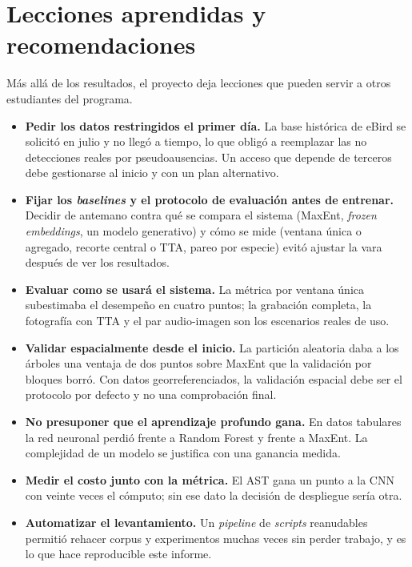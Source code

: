 \section{Lecciones aprendidas y recomendaciones}\label{sec:lecciones}

Más allá de los resultados, el proyecto deja lecciones que pueden servir a
otros estudiantes del programa.

\begin{itemize}[leftmargin=*, itemsep=3pt]
  \item \textbf{Pedir los datos restringidos el primer día.} La base
        histórica de eBird se solicitó en julio y no llegó a tiempo, lo que
        obligó a reemplazar las no detecciones reales por pseudoausencias.
        Un acceso que depende de terceros debe gestionarse al inicio y con
        un plan alternativo.
  \item \textbf{Fijar los \textit{baselines} y el protocolo de evaluación
        antes de entrenar.} Decidir de antemano contra qué se compara el
        sistema (MaxEnt, \textit{frozen embeddings}, un modelo generativo) y
        cómo se mide (ventana única o agregado, recorte central o TTA, pareo
        por especie) evitó ajustar la vara después de ver los resultados.
  \item \textbf{Evaluar como se usará el sistema.} La métrica por ventana
        única subestimaba el desempeño en cuatro puntos; la grabación
        completa, la fotografía con TTA y el par audio-imagen son los
        escenarios reales de uso.
  \item \textbf{Validar espacialmente desde el inicio.} La partición
        aleatoria daba a los árboles una ventaja de dos puntos sobre MaxEnt
        que la validación por bloques borró. Con datos georreferenciados, la
        validación espacial debe ser el protocolo por defecto y no una
        comprobación final.
  \item \textbf{No presuponer que el aprendizaje profundo gana.} En datos
        tabulares la red neuronal perdió frente a Random Forest y frente a
        MaxEnt. La complejidad de un modelo se justifica con una ganancia
        medida.
  \item \textbf{Medir el costo junto con la métrica.} El AST gana un punto a
        la CNN con veinte veces el cómputo; sin ese dato la decisión de
        despliegue sería otra.
  \item \textbf{Automatizar el levantamiento.} Un \textit{pipeline} de
        \textit{scripts} reanudables permitió rehacer corpus y experimentos
        muchas veces sin perder trabajo, y es lo que hace reproducible este
        informe.
\end{itemize}

